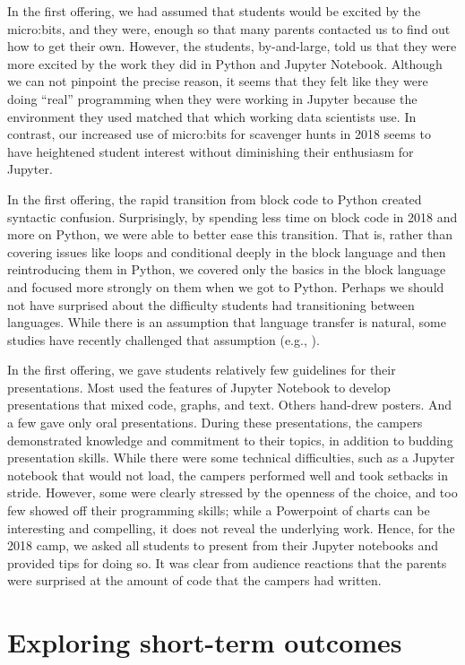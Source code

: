 In the first offering, we had assumed that students would be excited
by the micro:bits, and they were, enough so that many parents
contacted us to find out how to get their own.  However, the students,
by-and-large, told us that they were more excited by the work they
did in Python and Jupyter Notebook.  Although we can not pinpoint
the precise reason, it seems that they felt like they were doing
``real'' programming when they were working in Jupyter because the
environment they used matched that which working data scientists
use.  In contrast, our increased use of micro:bits for scavenger
hunts in 2018 seems to have heightened student interest without
diminishing their enthusiasm for Jupyter.

In the first offering, the rapid transition from block code to Python created
syntactic confusion.  Surprisingly, by spending less time on block
code in 2018 and more on Python, we were able to better ease this
transition.  That is, rather than covering issues like loops and
conditional deeply in the block language and then reintroducing
them in Python, we covered only the basics in the block language
and focused more strongly on them when we got to Python.  Perhaps
we should not have surprised about the difficulty students had
transitioning between languages.  While there is an assumption that
language transfer is natural, some studies have recently challenged
that assumption (e.g., \cite{Chetty2012,Dann2012}).

In the first offering, we gave students relatively few guidelines for their
presentations.  Most used the features of Jupyter Notebook to develop
presentations that mixed code, graphs, and text.  Others hand-drew
posters.  And a few gave only oral presentations.  During these
presentations, the campers demonstrated knowledge and commitment
to their topics, in addition to budding presentation skills. While
there were some technical difficulties, such as a Jupyter notebook
that would not load, the campers performed well and took setbacks
in stride.  However, some were clearly stressed by the openness of
the choice, and too few showed off their programming skills; while
a Powerpoint of charts can be interesting and compelling, it does
not reveal the underlying work.  Hence, for the 2018 camp, we asked
all students to present from their Jupyter notebooks and provided
tips for doing so.  It was clear from audience reactions that the
parents were surprised at the amount of code that the campers had
written.

\section{Exploring short-term outcomes}


